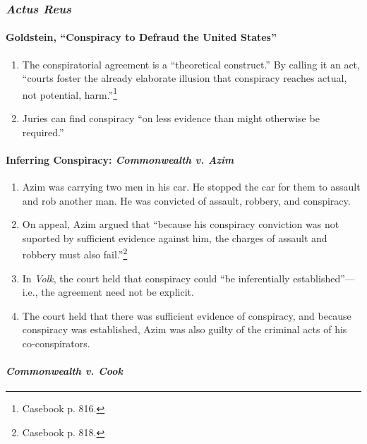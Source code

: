 \subsubsection{\emph{Actus Reus}}

\paragraph{Goldstein, ``Conspiracy to Defraud the United States''}

\begin{enumerate}
    \item The conspiratorial agreement is a ``theoretical construct.'' By 
    calling it an act, ``courts foster the already elaborate illusion that 
    conspiracy reaches actual, not potential, harm.''\footnote{Casebook p. 
    816.}
    \item Juries can find conspiracy ``on less evidence than might otherwise 
    be required.''
\end{enumerate}

\paragraph{Inferring Conspiracy: \emph{Commonwealth v. Azim}}

\begin{enumerate}
    \item Azim was carrying two men in his car. He stopped the car for them to 
    assault and rob another man. He was convicted of assault, robbery, and 
    conspiracy.
    \item On appeal, Azim argued that ``because his conspiracy conviction was 
    not suported by sufficient evidence against him, the charges of assault 
    and robbery must also fail.''\footnote{Casebook p. 818.}
    \item In \emph{Volk}, the court held that conspiracy could ``be 
    inferentially established''---i.e., the agreement need not be explicit.
    \item The court held that there was sufficient evidence of conspiracy, and 
    because conspiracy was established, Azim was also guilty of the criminal
    acts of his co-conspirators.
\end{enumerate}

\paragraph{\emph{Commonwealth v. Cook}}

